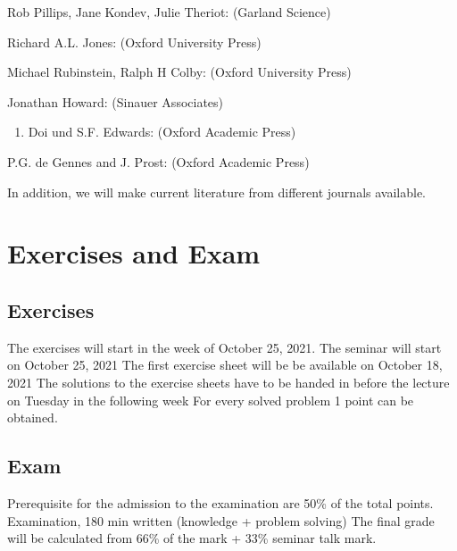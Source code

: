 \documentclass[letterpaper,10pt,english]{sphinxmanual}
\begin{document}
\sphinxAtStartPar
Rob Pillips, Jane Kondev, Julie Theriot:  (Garland Science)

\sphinxAtStartPar
Richard A.L. Jones:  (Oxford University Press)

\sphinxAtStartPar
Michael Rubinstein, Ralph H Colby:  (Oxford University Press)

\sphinxAtStartPar
Jonathan Howard:  (Sinauer Associates)
\begin{enumerate}
%
\setcounter{enumi}{12}
\item {} 
\sphinxAtStartPar
Doi und S.F. Edwards:  (Oxford Academic Press)

\end{enumerate}

\sphinxAtStartPar
P.G. de Gennes and J. Prost:  (Oxford Academic Press)

\sphinxAtStartPar
In addition, we will make current literature from different journals available.


\chapter{Exercises and Exam}
\label{\detokenize{course-info/exam:exercises-and-exam}}\label{\detokenize{course-info/exam::doc}}

\section{Exercises}
\label{\detokenize{course-info/exam:exercises}}
\sphinxAtStartPar
The exercises will start in the week of October 25, 2021.
The seminar will start on October 25, 2021
The first exercise sheet will be be available on October 18, 2021 
The solutions to the exercise sheets have to be handed in before the lecture on Tuesday in the following week
For every solved problem 1 point can be obtained.


\section{Exam}
\label{\detokenize{course-info/exam:exam}}
\sphinxAtStartPar
Prerequisite for the admission to the examination are 50\% of the total points.
Examination, 180 min written (knowledge + problem solving)
The final grade will be calculated from 66\% of the mark + 33\% seminar talk mark.
\end{document}
